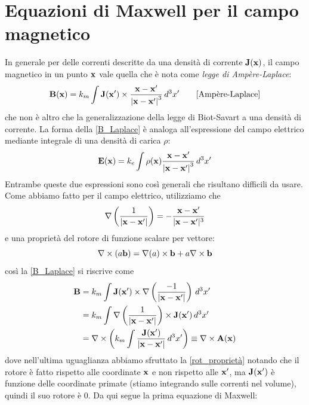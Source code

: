 \section{Equazioni di Maxwell per il campo magnetico} \label{section: eq Maxwell per B}
In generale per delle correnti descritte da una densità di corrente $ \mathbf{ J(x) } $, il campo magnetico in un punto $ \mathbf{ x } $ vale quella che 
è nota come \textit{legge di Ampère-Laplace}:
\begin{equation} 
  \mathbf{ B(x) } = k_m \int \mathbf{ J(x') } \times \frac{\mathbf{ x-x' }}{\mathbf{ |x-x'| }^3} \,d^3x' \tag*{[Ampère-Laplace]}
\end{equation}\label{B_Laplace}
che non è altro che la generalizzazione della legge di Biot-Savart a una densità di corrente. La forma della \eqref{B_Laplace} è analoga
all'espressione del campo elettrico mediante integrale di una densità di carica $ \rho $:
\begin{equation}
  \mathbf{ E(x) } = k_e \int \rho(\mathbf{ x }) \frac{\mathbf{ x-x' }}{\mathbf{ |x-x'| }^3}\,d^3x'
\end{equation}
Entrambe queste due espressioni sono così generali che risultano difficili da usare. Come abbiamo fatto per il campo elettrico, utilizziamo che
\begin{equation}
  \mathbf{\nabla}\left(\frac{1}{|\mathbf{ x-x'}|}\right) = - \frac{\mathbf{ x-x' }}{|\mathbf{ x-x' }|^3}
\end{equation}
e una proprietà del rotore di funzione scalare per vettore:
\begin{equation} \label{rot_proprietà}
  \mathbf{\nabla}\times(a\mathbf{ b }) = \nabla(a)\times\mathbf{ b } + a\nabla\times\mathbf{ b }
\end{equation}
così la \eqref{B_Laplace} si riscrive come
\begin{align}
  \mathbf{ B } &= k_m \int \mathbf{ J(x') }\times \mathbf{\nabla}\left(\frac{-1}{|\mathbf{ x-x'}|}\right)  \,d^3x'\\
  &= k_m \int \mathbf{\nabla}\left(\frac{1}{|\mathbf{ x-x'}|}\right) \times \mathbf{ J(x') }   \,d^3x' \nonumber \\
  &=  \nabla \times \left( k_m \int \frac{\mathbf{ J(x') } }{|\mathbf{ x-x' }|} \,d^3x' \right) \equiv \nabla \times \mathbf{ A(x) } \label{eq:rot_potenziale_vettore}
\end{align}
dove nell'ultima uguaglianza abbiamo sfruttato la \eqref{rot_proprietà} notando che il rotore è fatto rispetto 
alle coordinate $ \mathbf{ x } $ e non rispetto alle $ \mathbf{ x' } $, ma $ \mathbf{ J(x') } $ è funzione delle coordinate primate 
(stiamo integrando sulle correnti nel volume), quindi il suo rotore è 0. Da qui segue la prima equazione di Maxwell:
